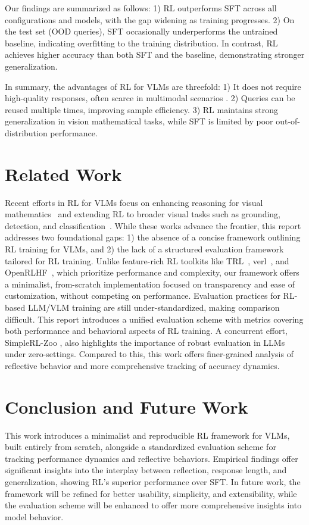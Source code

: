 \documentclass{article} %
\begin{document}
Our findings are summarized as follows:
%
1) RL outperforms SFT across all configurations and models, with the gap widening as training progresses.
%
2) On the test set (OOD queries), SFT occasionally underperforms the untrained baseline, indicating overfitting to the training distribution. In contrast, RL achieves higher accuracy than both SFT and the baseline, demonstrating stronger generalization.

In summary, the advantages of RL for VLMs are threefold: 1) It does not require high-quality responses, often scarce in multimodal scenarios \citep{guo2024mammothvl}. 2) Queries can be reused multiple times, improving sample efficiency. 3) RL maintains strong generalization in vision mathematical tasks, while SFT is limited by poor out-of-distribution performance.

\section{Related Work}
Recent efforts in RL for VLMs focus on enhancing reasoning for visual mathematics~\citep{meng2025mm, Huang2025VisionR1IR, Peng2025LMMR1E3, chen2025r1v} and extending RL to broader visual tasks such as grounding, detection, and classification~\citep{liu2025visual, shen2025vlmr1}.
%
While these works advance the frontier, this report addresses two foundational gaps: 1) the absence of a concise framework outlining RL training for VLMs, and 2) the lack of a structured evaluation framework tailored for RL training.
%
%
Unlike feature-rich RL toolkits like TRL~\citep{vonwerra2022trl}, verl~\citep{sheng2024hybridflow}, and OpenRLHF~\citep{hu2024openrlhf}, which prioritize performance and complexity, our framework offers a minimalist, from-scratch implementation focused on transparency and ease of customization, without competing on performance.
%
Evaluation practices for RL-based LLM/VLM training are still under-standardized, making comparison difficult.
%
This report introduces a unified evaluation scheme with metrics covering both performance and behavioral aspects of RL training.
%
A concurrent effort, SimpleRL-Zoo \citep{zeng2025simplerlzooinvestigatingtamingzero}, also highlights the importance of robust evaluation in LLMs under zero-settings.
%
Compared to this, this work offers finer-grained analysis of reflective behavior and more comprehensive tracking of accuracy dynamics.

\section{Conclusion and Future Work}
This work introduces a minimalist and reproducible RL framework for VLMs, built entirely from scratch, alongside a standardized evaluation scheme for tracking performance dynamics and reflective behaviors.
%
Empirical findings offer significant insights into the interplay between reflection, response length, and generalization, showing RL’s superior performance over SFT.
%
In future work, the framework will be refined for better usability, simplicity, and extensibility, while the evaluation scheme will be enhanced to offer more comprehensive insights into model behavior.
\end{document}
